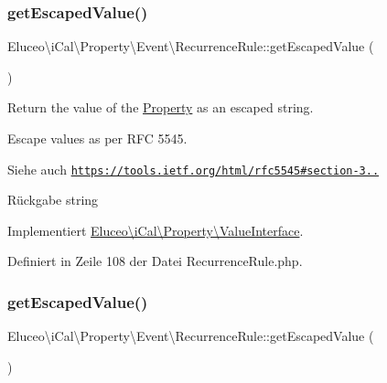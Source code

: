 \subsubsection{\texorpdfstring{get\+Escaped\+Value()}{getEscapedValue()}\hspace{0.1cm}{\footnotesize\ttfamily [2/3]}}
{\footnotesize\ttfamily Eluceo\textbackslash{}i\+Cal\textbackslash{}\+Property\textbackslash{}\+Event\textbackslash{}\+Recurrence\+Rule\+::get\+Escaped\+Value (\begin{DoxyParamCaption}{ }\end{DoxyParamCaption})}

Return the value of the \mbox{\hyperlink{class_eluceo_1_1i_cal_1_1_property}{Property}} as an escaped string.

Escape values as per R\+FC 5545.

\begin{DoxySeeAlso}{Siehe auch}
\href{https://tools.ietf.org/html/rfc5545#section-3.3.11}{\tt https\+://tools.\+ietf.\+org/html/rfc5545\#section-\/3..}
\end{DoxySeeAlso}
\begin{DoxyReturn}{Rückgabe}
string 
\end{DoxyReturn}


Implementiert \mbox{\hyperlink{interface_eluceo_1_1i_cal_1_1_property_1_1_value_interface_a408412ae5d11fd3f239c7985aede8c32}{Eluceo\textbackslash{}i\+Cal\textbackslash{}\+Property\textbackslash{}\+Value\+Interface}}.



Definiert in Zeile 108 der Datei Recurrence\+Rule.\+php.

\mbox{\label{class_eluceo_1_1i_cal_1_1_property_1_1_event_1_1_recurrence_rule_aeefc9e0958f7fbd8fc54d622c6fec793}} 
\subsubsection{\texorpdfstring{get\+Escaped\+Value()}{getEscapedValue()}\hspace{0.1cm}{\footnotesize\ttfamily [3/3]}}
{\footnotesize\ttfamily Eluceo\textbackslash{}i\+Cal\textbackslash{}\+Property\textbackslash{}\+Event\textbackslash{}\+Recurrence\+Rule\+::get\+Escaped\+Value (\begin{DoxyParamCaption}{ }\end{DoxyParamCaption})}

